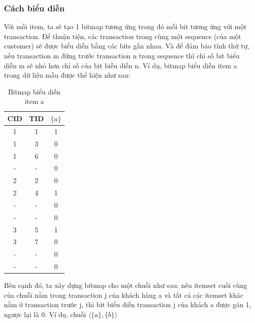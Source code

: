 \documentclass[a4paper 14pt]{article}
\begin{document}
			\subsubsection{Cách biểu diễn}
				Với mỗi item, ta sẽ tạo 1 bitmap tương ứng trong đó mỗi bit tương ứng với một transaction. Để thuận tiện, các transaction trong cùng một sequence (của một customer) sẽ được biểu diễn bằng các bits gần nhau. Và để đảm bảo tính thứ tự, nếu transaction m đứng trước transaction n trong sequence thì chỉ số bit biểu diễn m sẽ nhỏ hơn chỉ số của bit biễu diễn n. Ví dụ, bitmap biểu diễn item a trong dữ liệu mẫu được thể hiện như sau: \\
				\begin{table}[H]
					\begin{minipage}[t]{0.4\linewidth}
						\begin{tabular}{|c | c | c |}
							\hline
							CID & TID & $\{a\}$\\
							\hline
							1 & 1 & 1 \\
							1 & 3 & 0 \\
							1 & 6 & 0 \\
							- & - & 0 \\
							\hline
							2 & 2 & 0 \\
							2 & 4 & 1 \\
							- & - & 0 \\
							- & - & 0 \\
							\hline
							3 & 5 & 1 \\
							3 & 7 & 0 \\
							- & - & 0 \\
							- & - & 0 \\
							\hline
						\end{tabular}
						\caption{Bitmap biểu diễn item a}
					\end{minipage}
				\end{table}
				Bên cạnh đó, ta xây dựng bitmap cho một chuỗi như sau: nếu itemset cuối cùng của chuỗi nằm trong transaction j của khách hàng a và tất cả các itemset khác nằm ở transaction trước j, thì bit biểu diễn transaction j của khách a được gán 1, ngược lại là 0. Ví dụ, chuỗi $\langle \{a\}, \{b\} \rangle$\\
\end{document}
